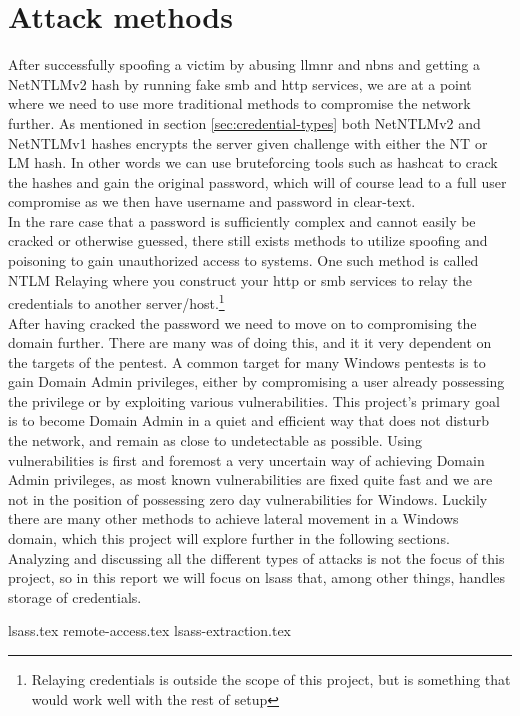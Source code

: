 \documentclass{article}
\begin{document}
\section{Attack methods}
\label{sec:attack-methods}
After successfully spoofing a victim by abusing \gls{llmnr} and \gls{nbns} and getting a NetNTLMv2 hash by running fake \gls{smb} and \gls{http} services, we are at a point where we need to use more traditional methods to compromise the network further. As mentioned in section \ref{sec:credential-types} both NetNTLMv2 and NetNTLMv1 hashes encrypts the server given challenge with either the NT or LM hash. In other words we can use bruteforcing tools such as hashcat\cite{url:hashes:hashcat-example-hashes} to crack the hashes and gain the original password, which will of course lead to a full user compromise as we then have username and password in clear-text.
\\
In the rare case that a password is sufficiently complex and cannot easily be cracked or otherwise guessed, there still exists methods to utilize spoofing and poisoning to gain unauthorized access to systems. One such method is called NTLM Relaying\cite{url:ntlm-relaying} where you construct your \gls{http} or \gls{smb} services to relay the credentials to another server/host.\footnote{Relaying credentials is outside the scope of this project, but is something that would work well with the rest of setup}
\\
After having cracked the password we need to move on to compromising the domain further. There are many was of doing this, and it it very dependent on the targets of the pentest. A common target for many Windows pentests is to gain Domain Admin privileges, either by compromising a user already possessing the privilege or by exploiting various vulnerabilities. This project's primary goal is to become Domain Admin in a quiet and efficient way that does not disturb the network, and remain as close to undetectable as possible. Using vulnerabilities is first and foremost a very uncertain way of achieving Domain Admin privileges, as most known vulnerabilities are fixed quite fast and we are not in the position of possessing zero day vulnerabilities for Windows. Luckily there are many other methods to achieve lateral movement in a Windows domain, which this project will explore further in the following sections. Analyzing and discussing all the different types of attacks is not the focus of this project, so in this report we will focus on \gls{lsass} that, among other things, handles storage of credentials.

{lsass.tex}
{remote-access.tex}
{lsass-extraction.tex}
\end{document}
